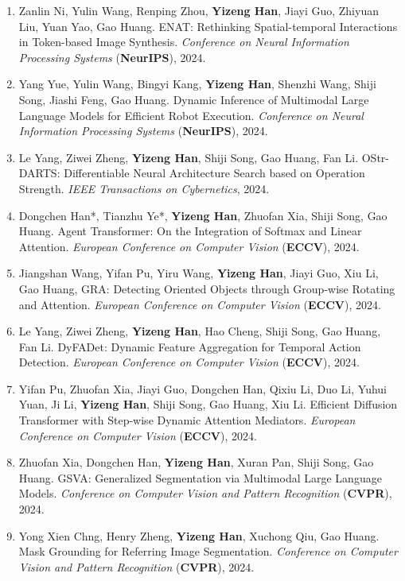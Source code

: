 \documentclass[10.5pt, UTF8]{ctexart}
\makeatletter
\newlength{\bibhang}
\newlength{\bibsep}
 {\@listi \global\bibsep\itemsep \global\advance\bibsep by\parsep}
\newenvironment{bibsection}%
        {\begin{enumerate}{%
       \setlength{\leftmargin}{-2em}%
       \setlength{\itemindent}{-2em}%
       \setlength{\itemsep}{\bibsep}%
        \setlength{\partopsep}{0pt}%
        \setlength{\topsep}{0pt}}}
        {\end{enumerate}\vspace{-.6\baselineskip}}
\makeatother
\begin{document}
\begin{sloppypar}
\begin{bibsection}
        \item Zanlin Ni, Yulin Wang, Renping Zhou, \textbf{Yizeng Han}, Jiayi Guo, Zhiyuan Liu, Yuan Yao, Gao Huang. ENAT: Rethinking Spatial-temporal Interactions in Token-based Image Synthesis. \emph{Conference on Neural Information Processing Systems} (\textbf{NeurIPS}), 2024.
        \item Yang Yue, Yulin Wang, Bingyi Kang, \textbf{Yizeng Han}, Shenzhi Wang, Shiji Song, Jiashi Feng, Gao Huang. Dynamic Inference of Multimodal Large Language Models for Efficient Robot Execution.  \emph{Conference on Neural Information Processing Systems} (\textbf{NeurIPS}), 2024.
        \item Le Yang, Ziwei Zheng, \textbf{Yizeng Han}, Shiji Song, Gao Huang, Fan Li. OStr-DARTS: Differentiable Neural Architecture Search based on Operation Strength. \emph{IEEE Transactions on Cybernetics}, 2024.
        \item Dongchen Han*, Tianzhu Ye*, \textbf{Yizeng Han}, Zhuofan Xia, Shiji Song, Gao Huang. Agent Transformer: On the Integration of Softmax and Linear Attention. \emph{European Conference on Computer Vision} (\textbf{ECCV}), 2024.
        \item Jiangshan Wang, Yifan Pu, Yiru Wang, \textbf{Yizeng Han}, Jiayi Guo, Xiu Li, Gao Huang, GRA: Detecting Oriented Objects through Group-wise Rotating and Attention. \emph{European Conference on Computer Vision} (\textbf{ECCV}), 2024.
        \item Le Yang, Ziwei Zheng, \textbf{Yizeng Han}, Hao Cheng, Shiji Song, Gao Huang, Fan Li. DyFADet: Dynamic Feature Aggregation for Temporal Action Detection. \emph{European Conference on Computer Vision} (\textbf{ECCV}), 2024.
        \item Yifan Pu, Zhuofan Xia, Jiayi Guo, Dongchen Han, Qixiu Li, Duo Li, Yuhui Yuan, Ji Li, \textbf{Yizeng Han}, Shiji Song, Gao Huang, Xiu Li. Efficient Diffusion Transformer with Step-wise Dynamic Attention Mediators. \emph{European Conference on Computer Vision} (\textbf{ECCV}), 2024.
        \item Zhuofan Xia, Dongchen Han, \textbf{Yizeng Han}, Xuran Pan, Shiji Song, Gao Huang. GSVA: Generalized Segmentation via Multimodal Large Language Models. \emph{Conference on Computer Vision and Pattern Recognition} (\textbf{CVPR}), 2024.
        \item Yong Xien Chng, Henry Zheng, \textbf{Yizeng Han}, Xuchong Qiu, Gao Huang. Mask Grounding for Referring Image Segmentation. \emph{Conference on Computer Vision and Pattern Recognition} (\textbf{CVPR}), 2024.

\end{bibsection}
\end{sloppypar}
\end{document}
